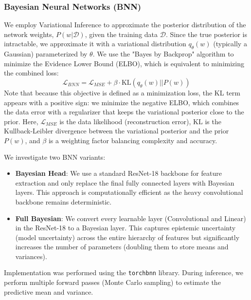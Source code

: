 \subsubsection{Bayesian Neural Networks (BNN)}
We employ Variational Inference to approximate the posterior distribution of the network weights, $P(w|\mathcal{D})$, given the training data $\mathcal{D}$. Since the true posterior is intractable, we approximate it with a variational distribution $q_\theta(w)$ (typically a Gaussian) parameterized by $\theta$. We use the "Bayes by Backprop" algorithm \cite{blundell2015weight} to minimize the Evidence Lower Bound (ELBO), which is equivalent to minimizing the combined loss:
\begin{equation}
    \mathcal{L}_{BNN} = \mathcal{L}_{MSE} + \beta \cdot \text{KL}(q_\theta(w) || P(w))
\end{equation}
Note that because this objective is defined as a minimization loss, the KL term appears with a positive sign: we minimize the negative ELBO, which combines the data error with a regularizer that keeps the variational posterior close to the prior. Here, $\mathcal{L}_{MSE}$ is the data likelihood (reconstruction error), $\text{KL}$ is the Kullback-Leibler divergence between the variational posterior and the prior $P(w)$, and $\beta$ is a weighting factor balancing complexity and accuracy.

We investigate two BNN variants:
\begin{itemize}
    \item \textbf{Bayesian Head}: We use a standard ResNet-18 backbone for feature extraction and only replace the final fully connected layers with Bayesian layers. This approach is computationally efficient as the heavy convolutional backbone remains deterministic.
    \item \textbf{Full Bayesian}: We convert every learnable layer (Convolutional and Linear) in the ResNet-18 to a Bayesian layer. This captures epistemic uncertainty (model uncertainty) across the entire hierarchy of features but significantly increases the number of parameters (doubling them to store means and variances).
\end{itemize}
Implementation was performed using the \texttt{torchbnn} library. During inference, we perform multiple forward passes (Monte Carlo sampling) to estimate the predictive mean and variance.

